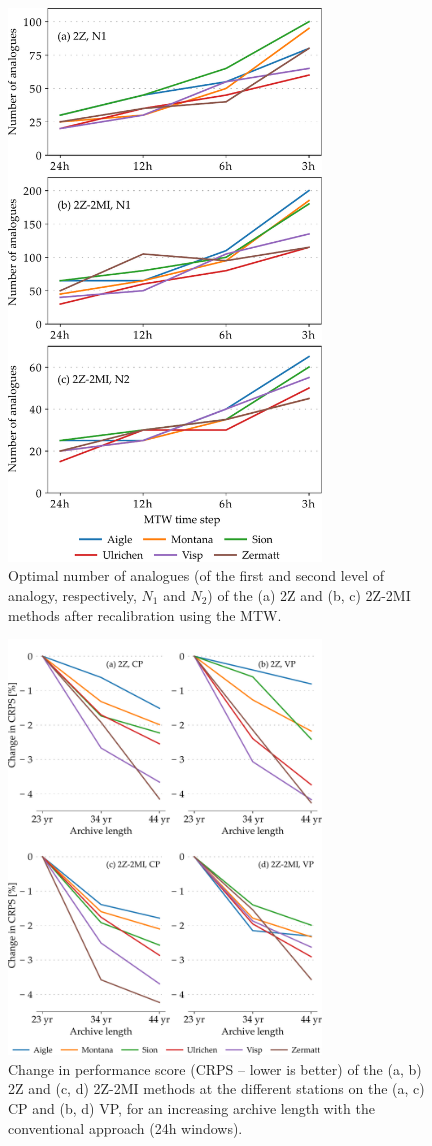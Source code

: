\documentclass[hess, manuscript]{copernicus}
\begin{document}
	\begin{figure}[htb]
		\includegraphics[width=8.3cm]{fig13.pdf}
		\caption{Optimal number of analogues (of the first and second level of analogy, respectively, $N_{1}$ and $N_{2}$) of the (a) 2Z and (b, c) 2Z-2MI methods after recalibration using the MTW.}
		\label{fig:analog_nb}
	\end{figure}
	
	\begin{figure}[htb]
		\includegraphics[width=8.3cm]{fig14.pdf}
		\caption{Change in performance score (CRPS -- lower is better) of the (a, b) 2Z and (c, d) 2Z-2MI methods at the different stations on the (a, c) CP and (b, d) VP, for an increasing archive length with the conventional approach (24h windows).}
		\label{fig:plots_archive_length}
	\end{figure}
	
\end{document}

